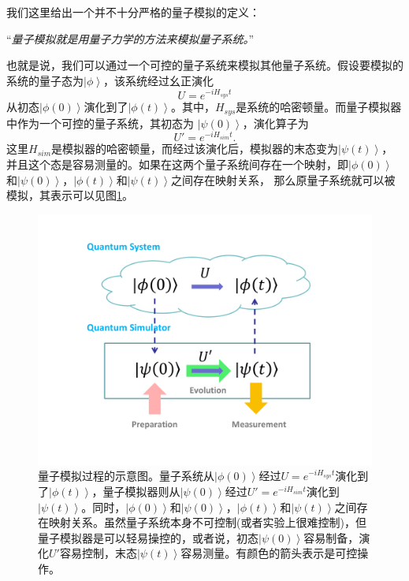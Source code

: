 我们这里给出一个并不十分严格的量子模拟的定义：

   “\emph{量子模拟就是用量子力学的方法来模拟量子系统。}”

也就是说，我们可以通过一个可控的量子系统来模拟其他量子系统\cite{simreview}。假设要模拟的系统的量子态为$\left\vert \phi \right\rangle$，该系统经过幺正演化
\begin{equation}
          U = e^{-iH_{sys}t}
 \end{equation}
从初态$\left\vert \phi(0) \right\rangle$演化到了$\left\vert \phi(t) \right\rangle$。其中，$H_{sys}$是系统的哈密顿量。而量子模拟器中作为一个可控的量子系统，其初态为
$\left\vert \psi(0) \right\rangle$，演化算子为
\begin{equation}
          U' = e^{-iH_{sim}t}.
 \end{equation}
 这里$H_{sim}$是模拟器的哈密顿量，而经过该演化后，模拟器的末态变为$\left\vert \psi(t) \right\rangle$，并且这个态是容易测量的。如果在这两个量子系统间存在一个映射，即$\left\vert \phi(0) \right\rangle$和$\left\vert \psi(0) \right\rangle$，$\left\vert \phi(t) \right\rangle$和$\left\vert \psi(t) \right\rangle$之间存在映射关系，
 那么原量子系统就可以被模拟，其表示可以见图\ref{schematic}。
        \begin{figure}[htbp]
            \begin{center}
              \includegraphics[width= 0.8\columnwidth]{figures/schematic.pdf}
              \caption{量子模拟过程的示意图。量子系统从$\left\vert \phi(0) \right\rangle$经过$U = e^{-iH_{sys}t}$演化到了$\left\vert \phi(t) \right\rangle$，量子模拟器则从$\left\vert \psi(0) \right\rangle$经过$U' = e^{-iH_{sim}t}$演化到$\left\vert \psi(t) \right\rangle$。同时，$\left\vert \phi(0) \right\rangle$和$\left\vert \psi(0) \right\rangle$，$\left\vert \phi(t) \right\rangle$和$\left\vert \psi(t) \right\rangle$之间存在映射关系。虽然量子系统本身不可控制(或者实验上很难控制)，但量子模拟器是可以轻易操控的，或者说，初态$\left\vert \psi(0) \right\rangle$容易制备，演化$U'$容易控制，末态$\left\vert \psi(t) \right\rangle$容易测量。有颜色的箭头表示是可控操作。
              }
              \label{schematic}
            \end{center}
        \end{figure}

